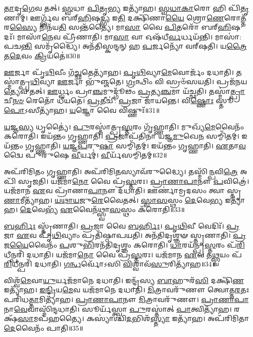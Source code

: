 \-\ul{𑌤𑌾}\-𑌦𑍃\-\ul{𑌗𑍇}\-𑌵 𑌤𑌤𑍍।
\-\ul{𑌸𑍍𑌵}\-𑌧𑌾 \ul{𑌪𑌿}\-𑌤𑍃\-\ul{𑌭𑍍𑌯} 𑌇𑌤𑍍𑌯𑌾᳴𑌹।
\-\ul{𑌸𑍍𑌵}\-\-\ul{𑌧𑌾}\-\-\ul{𑌕𑌾}\-𑌰𑍋 𑌹𑌿 𑌪𑌿᳴\-\ul{𑌤𑍃}\-𑌣𑌾𑌮𑍍।
𑌊𑌰𑍍𑌗𑍍𑌭᳴𑌵 𑌬𑌰𑍍‌\mbox{}\-\ul{𑌹𑌿}\-𑌷\-\ul{𑌦𑍍𑌭𑍍𑌯} 𑌇\-\ul{𑌤𑌿} 𑌦𑌕𑍍𑌷𑌿᳴𑌣𑌾\-\ul{𑌯𑍈} 𑌶𑍍𑌰𑍋\-\ul{𑌣𑍇}\-𑌰𑍋𑌤𑍍𑌤᳴𑌰\-\ul{𑌸𑍍𑌯𑍈} 𑌨𑌿𑌨᳴𑌯\-\ul{𑌤𑌿} 𑌸𑌨𑍍𑌤᳴𑌤𑍍𑌯𑍈।
𑌮𑌾\-\ul{𑌸𑌾} 𑌵𑍈 \ul{𑌪𑌿}\-𑌤𑌰𑍋᳴ 𑌬𑌰𑍍‌\mbox{}\-\ul{𑌹𑌿}\-𑌷𑌦𑌃᳴।
𑌮𑌾𑌸𑌾᳴\-\ul{𑌨𑍇}\-𑌵 𑌪𑍍𑌰𑍀᳴𑌣𑌾𑌤𑌿।
𑌮𑌾\-\ul{𑌸𑌾} 𑌵𑌾 𑌓𑌷᳴𑌧𑍀\-\ul{𑌰𑍍𑌵}\-𑌰𑍍𑌧𑌯᳴𑌨𑍍𑌤𑌿।
𑌮𑌾𑌸𑌾॑: 𑌪𑌚\-\ul{𑌨𑍍𑌤𑌿} 𑌸𑌮𑍃᳴𑌦𑍍𑌧𑍍𑌯𑍈।
𑌅𑌨᳴𑌤𑌿𑌸𑍍𑌕𑌨𑍍𑌦𑌨𑍍 𑌹 \ul{𑌪}\-𑌰𑍍𑌜𑌨𑍍𑌯𑍋᳴ 𑌵𑌰𑍍‌\mbox{}𑌷𑌤𑌿।
𑌯\-\ul{𑌤𑍍𑌰𑍈}\-𑌤\-\ul{𑌦𑍇}\-𑌵𑌂 \ul{𑌕𑍍𑌰𑌿}\-𑌯𑌤𑍇॑॥30॥

\-\ul{𑌊}\-𑌰𑍍𑌜𑌾 𑌪𑍃᳴\-\ul{𑌥𑌿}\-𑌵𑍀𑌂 𑌗᳴\-\ul{𑌚𑍍𑌛}\-𑌤𑍇𑌤𑍍𑌯𑌾᳴𑌹।
\-\ul{𑌪𑍃}\-\-\ul{𑌥𑌿}\-𑌵𑍍𑌯𑌾\-\ul{𑌮𑍇}\-𑌵𑍋𑌰𑍍𑌜𑌂᳴ 𑌦𑌧𑌾𑌤𑌿।
𑌤𑌸𑍍𑌮𑌾॑𑌤𑍍𑌪𑍃\-\ul{𑌥𑌿}\-𑌵𑍍𑌯𑌾 \ul{𑌊}\-𑌰𑍍𑌜𑌾 𑌭𑍁᳴𑌞𑍍𑌜𑌤𑍇।
\-\ul{𑌗𑍍𑌰}\-𑌨𑍍𑌥𑌿𑌂 𑌵𑌿 𑌸𑍍𑌰𑍞᳴𑌸𑌯𑌤𑌿।
𑌪𑍍𑌰𑌜᳴𑌨𑌯\-\ul{𑌤𑍍𑌯𑍇}\-𑌵 𑌤𑌤𑍍।
\-\ul{𑌊}\-𑌰𑍍𑌧𑍍𑌵𑌂 𑌪𑍍𑌰𑌾\-\ul{𑌞𑍍𑌚}\-𑌮𑍁𑌦𑍍𑌗𑍂᳴𑌢𑌂 \ul{𑌪𑍍𑌰}\-𑌤𑍍𑌯\-\ul{𑌞𑍍𑌚}\-𑌮𑌾 𑌯᳴𑌚𑍍𑌛𑌤𑌿।
𑌤𑌸𑍍𑌮𑌾॑\-\ul{𑌤𑍍𑌪𑍍𑌰𑌾}\-𑌚𑍀\-\ul{𑌨}\-\-\ul{𑍞} 𑌰𑍇𑌤𑍋᳴ 𑌧𑍀𑌯𑌤𑍇।
\-\ul{𑌪𑍍𑌰}\-𑌤𑍀𑌚𑍀॑: \ul{𑌪𑍍𑌰}\-𑌜𑌾 𑌜𑌾᳴𑌯𑌨𑍍𑌤𑍇।
𑌵𑌿\-\ul{𑌷𑍍𑌣𑍋𑌃} 𑌸𑍍𑌤𑍂\-\ul{𑌪𑍋}\-\-𑌽𑌸𑍀𑌤𑍍𑌯𑌾᳴𑌹।
\-\ul{𑌯}\-𑌜𑍍𑌞𑍋 𑌵𑍈 𑌵𑌿𑌷𑍍𑌣𑍁𑌃᳴॥31॥

\-\ul{𑌯}\-𑌜𑍍𑌞\-\ul{𑌸𑍍𑌯} 𑌧𑍃𑌤𑍍𑌯𑍈॑।
\-\ul{𑌪𑍁}\-𑌰𑌸𑍍𑌤𑌾॑𑌤𑍍𑌪𑍍𑌰\-\ul{𑌸𑍍𑌤}\-𑌰𑌂 𑌗𑍃᳴𑌹𑍍𑌣𑌾𑌤𑌿।
𑌮𑍁𑌖𑍍𑌯᳴\-\ul{𑌮𑍇}\-𑌵𑍈𑌨𑌂᳴ 𑌕𑌰𑍋𑌤𑌿।
𑌇𑌯᳴𑌨𑍍𑌤𑌂 𑌗𑍃𑌹𑍍𑌣𑌾𑌤𑌿।
\-\ul{𑌪𑍍𑌰}\-𑌜𑌾𑌪᳴𑌤𑌿𑌨𑌾 𑌯𑌜𑍍𑌞\-\ul{𑌮𑍁}\-𑌖𑍇\-\ul{𑌨} 𑌸𑌮𑍍𑌮𑌿᳴𑌤𑌮𑍍।
𑌇𑌯᳴𑌨𑍍𑌤𑌂 𑌗𑍃𑌹𑍍𑌣𑌾𑌤𑌿।
\-\ul{𑌯}\-\-\ul{𑌜𑍍𑌞}\-\-\ul{𑌪}\-𑌰𑍁\-\ul{𑌷𑌾} 𑌸𑌮𑍍𑌮𑌿᳴𑌤𑌮𑍍।
𑌇𑌯᳴𑌨𑍍𑌤𑌂 𑌗𑍃𑌹𑍍𑌣𑌾𑌤𑌿।
\-\ul{𑌏}\-𑌤𑌾\-\ul{𑌵}\-𑌦𑍍𑌵𑍈 𑌪𑍁𑌰𑍁᳴𑌷𑍇 \ul{𑌵𑍀}\-𑌰𑍍𑌯𑌮𑍍॑।
\-\ul{𑌵𑍀}\-𑌰𑍍𑌯᳴𑌸𑌮𑍍𑌮𑌿𑌤𑌮𑍍॥32॥

𑌅𑌪᳴𑌰𑌿𑌮𑌿𑌤𑌂 𑌗𑍃𑌹𑍍𑌣𑌾𑌤𑌿।
𑌅𑌪᳴𑌰𑌿𑌮𑌿\-\ul{𑌤}\-𑌸𑍍𑌯𑌾𑌵᳴𑌰𑍁𑌦𑍍𑌧𑍍𑌯𑍈।
𑌤𑌸𑍍𑌮𑌿᳴\-\ul{𑌨𑍍𑌪}\-𑌵𑌿\-\ul{𑌤𑍍𑌰𑍇} 𑌅𑌪𑌿᳴ 𑌸𑍃𑌜𑌤𑌿।
𑌯𑌜᳴𑌮𑌾\-\ul{𑌨𑍋} 𑌵𑍈 𑌪𑍍𑌰᳴\-\ul{𑌸𑍍𑌤}\-𑌰𑌃।
\-\ul{𑌪𑍍𑌰𑌾}\-\-\ul{𑌣𑌾}\-\-\ul{𑌪𑌾}\-𑌨𑍗 \ul{𑌪}\-𑌵𑌿𑌤𑍍𑌰𑍇॑।
𑌯𑌜᳴𑌮𑌾𑌨 \ul{𑌏}\-𑌵 𑌪𑍍𑌰𑌾᳴𑌣𑌾\-\ul{𑌪𑌾}\-𑌨𑍗 𑌦᳴𑌧𑌾𑌤𑌿।
𑌊𑌰𑍍𑌣𑌾॑𑌮𑍍𑌰𑌦𑌸𑌂 𑌤𑍍𑌵𑌾 𑌸𑍍𑌤𑍃\-\ul{𑌣𑌾}\-𑌮𑍀𑌤𑍍𑌯𑌾᳴𑌹।
\-\ul{𑌯}\-\-\ul{𑌥𑌾}\-\-\ul{𑌯}\-𑌜𑍁\-\ul{𑌰𑍇}\-𑌵𑍈𑌤𑌤𑍍।
\-\ul{𑌸𑍍𑌵𑌾}\-\-\ul{𑌸}\-𑌸𑍍𑌥𑌂 \ul{𑌦𑍇}\-𑌵𑍇\-\ul{𑌭𑍍𑌯} 𑌇𑌤𑍍𑌯𑌾᳴𑌹।
\-\ul{𑌦𑍇}\-𑌵𑍇𑌭𑍍𑌯᳴ \ul{𑌏}\-𑌵𑍈𑌨᳴𑌥𑍍𑌸𑍍𑌵𑌾\-\ul{𑌸}\-𑌸𑍍𑌥𑌂 𑌕᳴𑌰𑍋𑌤𑌿॥33॥

\-\ul{𑌬}\-\-\ul{𑌰𑍍}\-𑌹𑌿𑌃 𑌸𑍍𑌤𑍃᳴𑌣𑌾𑌤𑌿।
\-\ul{𑌪𑍍𑌰}\-𑌜𑌾 𑌵𑍈 \ul{𑌬}\-\-\ul{𑌰𑍍}\-𑌹𑌿𑌃।
\-\ul{𑌪𑍃}\-\-\ul{𑌥𑌿}\-𑌵𑍀 𑌵𑍇𑌦𑌿𑌃᳴।
\-\ul{𑌪𑍍𑌰}\-𑌜𑌾 \ul{𑌏}\-𑌵 𑌪𑍃᳴\-\ul{𑌥𑌿}\-𑌵𑍍𑌯𑌾𑌂 𑌪𑍍𑌰𑌤𑌿᳴\-𑌷𑍍𑌠𑌾𑌪𑌯𑌤𑌿।
𑌅𑌨᳴𑌤𑌿𑌦𑍃𑌶𑍍𑌞𑍟 𑌸𑍍𑌤𑍃𑌣𑌾𑌤𑌿।
\-\ul{𑌪𑍍𑌰}\-𑌜\-\ul{𑌯𑍈}\-𑌵𑍈𑌨𑌂᳴ \ul{𑌪}\-𑌶𑍁\-\ul{𑌭𑌿}\-𑌰𑌨᳴𑌤𑌿𑌦𑍃𑌶𑍍𑌞𑌂 𑌕𑌰𑍋𑌤𑌿।
\-\ul{𑌧𑌾}\-𑌰𑌯᳴𑌨𑍍𑌪𑍍𑌰\-\ul{𑌸𑍍𑌤}\-𑌰𑌂 𑌪᳴\-\ul{𑌰𑌿}\-𑌧𑍀𑌨𑍍𑌪𑌰𑌿᳴ 𑌦𑌧𑌾𑌤𑌿।
𑌯𑌜᳴𑌮𑌾\-\ul{𑌨𑍋} 𑌵𑍈 𑌪𑍍𑌰᳴\-\ul{𑌸𑍍𑌤}\-𑌰𑌃।
𑌯𑌜᳴𑌮𑌾𑌨 \ul{𑌏}\-𑌵 𑌤\-\ul{𑌥𑍍𑌸𑍍𑌵}\-𑌯𑌂 𑌪᳴\-\ul{𑌰𑌿}\-𑌧𑍀𑌨𑍍𑌪𑌰𑌿᳴ 𑌦𑌧𑌾𑌤𑌿।
\-\ul{𑌗}\-\-\ul{𑌨𑍍𑌧}\-𑌰𑍍𑌵𑍋᳴𑌽𑌸𑌿 \ul{𑌵𑌿}\-𑌶𑍍𑌵𑌾𑌵᳴\-\ul{𑌸𑍁}\-𑌰𑌿𑌤𑍍𑌯𑌾᳴𑌹॥34॥

𑌵𑌿𑌶𑍍𑌵᳴\-\ul{𑌮𑍇}\-𑌵𑌾\-\ul{𑌯𑍁}\-𑌰𑍍𑌯𑌜᳴𑌮𑌾𑌨𑍇 𑌦𑌧𑌾𑌤𑌿।
𑌇𑌨𑍍𑌦𑍍𑌰᳴𑌸𑍍𑌯 \ul{𑌬𑌾}\-𑌹𑍁𑌰᳴\-\ul{𑌸𑌿} 𑌦𑌕𑍍𑌷𑌿᳴\-\ul{𑌣} 𑌇𑌤𑍍𑌯𑌾᳴𑌹।
\-\ul{𑌇}\-\-\ul{𑌨𑍍𑌦𑍍𑌰𑌿}\-𑌯\-\ul{𑌮𑍇}\-𑌵 𑌯𑌜᳴𑌮𑌾𑌨𑍇 𑌦𑌧𑌾𑌤𑌿।
\-\ul{𑌮𑌿}\-𑌤𑍍𑌰𑌾𑌵𑌰𑍁᳴𑌣𑍗 𑌤𑍍𑌵𑍋𑌤𑍍𑌤\-\ul{𑌰}\-𑌤𑌃 𑌪𑌰𑌿᳴𑌧\-\ul{𑌤𑍍𑌤𑌾}\-𑌮𑌿𑌤𑍍𑌯𑌾᳴𑌹।
\-\ul{𑌪𑍍𑌰𑌾}\-\-\ul{𑌣𑌾}\-\-\ul{𑌪𑌾}\-𑌨𑍗 \ul{𑌮𑌿}\-𑌤𑍍𑌰𑌾𑌵𑌰𑍁᳴𑌣𑍗।
\-\ul{𑌪𑍍𑌰𑌾}\-\-\ul{𑌣𑌾}\-\-\ul{𑌪𑌾}\-𑌨𑌾\-\-\ul{𑌵𑍇}\-𑌵𑌾𑌸𑍍𑌮𑌿᳴𑌨𑍍𑌦\-𑌧𑌾𑌤𑌿।
𑌸𑍂𑌰𑍍𑌯᳴𑌸𑍍𑌤𑍍𑌵𑌾 \ul{𑌪𑍁}\-𑌰𑌸𑍍𑌤𑌾॑𑌤𑍍 \ul{𑌪𑌾}\-𑌤𑍍𑌵𑌿𑌤𑍍𑌯𑌾᳴𑌹।
𑌰𑌕𑍍𑌷᳴\-\ul{𑌸𑌾}\-𑌮𑌪᳴𑌹𑌤𑍍𑌯𑍈।
𑌕𑌸𑍍𑌯𑌾॑𑌶𑍍𑌚𑌿\-\ul{𑌦}\-𑌭𑌿𑌶᳴\-\ul{𑌸𑍍𑌤𑍍𑌯𑌾} 𑌇𑌤𑍍𑌯𑌾᳴𑌹।
𑌅𑌪᳴𑌰𑌿𑌮𑌿𑌤𑌾\-\ul{𑌦𑍇}\-𑌵𑍈𑌨𑌂᳴ 𑌪𑌾𑌤𑌿॥35॥

